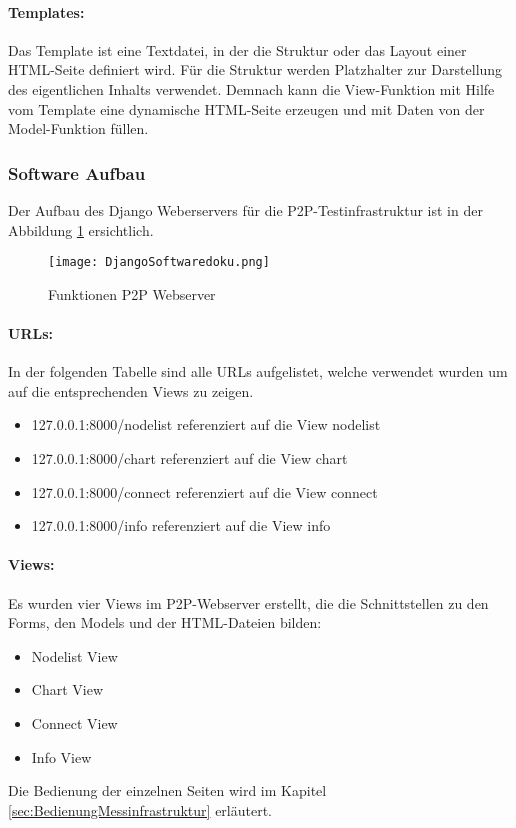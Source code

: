 \paragraph{Templates: }\label{par:1Templates}
Das Template ist eine Textdatei, in der die Struktur oder das Layout einer HTML-Seite definiert wird. Für die Struktur werden Platzhalter zur Darstellung des eigentlichen Inhalts  verwendet. Demnach kann die View-Funktion mit Hilfe vom Template eine dynamische HTML-Seite erzeugen und mit Daten von der Model-Funktion füllen.

\newpage
\subsubsection{Software Aufbau}\label{subsubsec:SoftwareAufbau}
Der Aufbau des Django Weberservers für die P2P-Testinfrastruktur ist in der Abbildung \ref{fig:FunktionenP2PWebserver} ersichtlich.
\begin{figure} [H]
	\centering
	\texttt{[image: DjangoSoftwaredoku.png]}
	\caption{Funktionen P2P Webserver}
	\label{fig:FunktionenP2PWebserver}
\end{figure}


\paragraph{URLs: }\label{par:2URLs}
In der folgenden Tabelle sind alle URLs aufgelistet, welche verwendet wurden um auf die entsprechenden Views zu zeigen.
\begin{itemize}
	\item 127.0.0.1:8000/node\textunderscore list \hspace{2.5mm} referenziert auf die View node\textunderscore list
	\item 127.0.0.1:8000/chart \hspace{10mm} referenziert auf die View chart
	\item 127.0.0.1:8000/connect \hspace{6mm} referenziert auf die View connect
	\item 127.0.0.1:8000/info \hspace{12.5mm} referenziert auf die View info
\end{itemize} 

\vspace{5mm}
\paragraph{Views:}\label{par:2Views}
Es wurden vier Views im P2P-Webserver erstellt, die die Schnittstellen zu den Forms, den Models und der HTML-Dateien bilden:
\begin{itemize}
	\item Node\textunderscore list View
	\item Chart View
	\item Connect View
	\item Info View
\end{itemize} 
Die Bedienung der einzelnen Seiten wird im Kapitel \ref{sec:BedienungMessinfrastruktur} erläutert.

